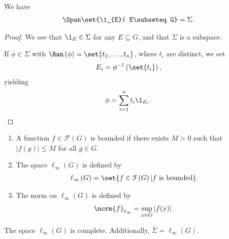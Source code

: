 \begin{fact}
  We have
  \begin{align*}
    \Span\set{\1_{E}| E\subseteq G} &= \Sigma.
  \end{align*}
\end{fact}
\begin{proof}
  We see that $\1_{E}\in \Sigma$ for any $E\subseteq G$, and that $\Sigma$ is a subspace.\newline

  If $\phi\in \Sigma$ with $\Ran\left(\phi\right) = \set{t_1,\dots,t_n}$, where $t_i$ are distinct, we set
  \begin{align*}
    E_i &= \phi^{-1}\left(\set{t_i}\right),
  \end{align*}
  yielding
  \begin{align*}
    \phi &= \sum_{i=1}^{n}t_i\1_{E_i}.
  \end{align*}
\end{proof}
\begin{definition}\hfill
  \begin{enumerate}[(1)]
    \item A function $f\in \mathcal{F}\left(G\right)$ is bounded if there exists $M > 0$ such that $\left\vert f(g) \right\vert \leq M$ for all $g\in G$.
    \item The space $\ell_{\infty}\left(G\right)$ is defined by
      \begin{align*}
        \ell_{\infty}\left(G\right) &= \set{f\in \mathcal{F}\left(G\right)| f\text{ is bounded}}.
      \end{align*}
    \item The norm on $\ell_{\infty}\left(G\right)$ is defined by
      \begin{align*}
        \norm{f}_{\ell_{\infty}} &= \sup_{x\in G}\left\vert f(x) \right\vert.
      \end{align*}
  \end{enumerate}
\end{definition}
\begin{proposition}
  The space $\ell_{\infty}(G)$ is complete. Additionally, $\overline{\Sigma} = \ell_{\infty}\left(G\right)$.
\end{proposition}
